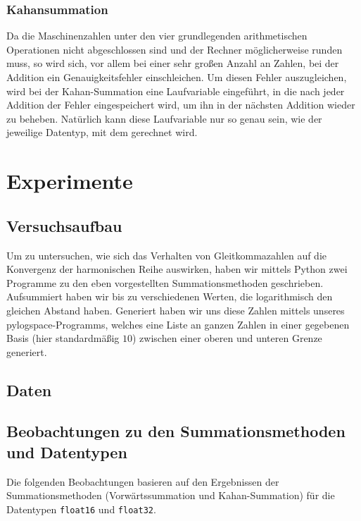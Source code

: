 \documentclass{scrartcl}
\begin{document}
\subsubsection{Kahansummation}
Da die Maschinenzahlen unter den vier grundlegenden arithmetischen Operationen
nicht abgeschlossen sind und der Rechner möglicherweise runden muss, so wird
sich, vor allem bei einer sehr großen Anzahl an Zahlen, bei der Addition ein
Genauigkeitsfehler einschleichen.
Um diesen Fehler auszugleichen, wird bei der Kahan-Summation eine Laufvariable
eingeführt, in die nach jeder Addition der Fehler eingespeichert wird, um ihn
in der nächsten Addition wieder zu beheben.
Natürlich kann diese Laufvariable nur so genau sein, wie der jeweilige
Datentyp, mit dem gerechnet wird.

\section{Experimente}

\subsection{Versuchsaufbau}
Um zu untersuchen, wie sich das Verhalten von Gleitkommazahlen auf die
Konvergenz der harmonischen Reihe auswirken, haben wir mittels Python zwei
Programme zu den eben vorgestellten Summationsmethoden geschrieben.
Aufsummiert haben wir bis zu verschiedenen Werten, die logarithmisch den
gleichen Abstand haben.
Generiert haben wir uns diese Zahlen mittels unseres pylogspace-Programms,
welches eine Liste an ganzen Zahlen in einer gegebenen Basis (hier
standardmäßig \(10\)) zwischen einer oberen und unteren Grenze generiert.

\subsection{Daten}

\begin{center}
\end{center}

\subsection{Beobachtungen zu den Summationsmethoden und Datentypen}

Die folgenden Beobachtungen basieren auf den Ergebnissen der Summationsmethoden
(Vorwärtssummation und Kahan-Summation) für die Datentypen \texttt{float16} und
\texttt{float32}.
\end{document}
